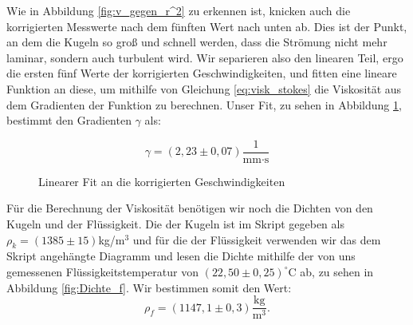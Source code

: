 \documentclass{article}
\begin{document}
\newpage
Wie in Abbildung \ref{fig:v_gegen_r^2} zu erkennen ist, knicken auch die korrigierten Messwerte nach dem fünften Wert nach unten ab. Dies ist der Punkt, an dem die Kugeln so groß und schnell werden, dass die Strömung nicht mehr laminar, sondern auch turbulent wird. Wir separieren also den linearen Teil, ergo die ersten fünf Werte der korrigierten Geschwindigkeiten, und fitten eine lineare Funktion an diese, um mithilfe von Gleichung \ref{eq:visk_stokes} die Viskosität aus dem Gradienten der Funktion zu berechnen. Unser Fit, zu sehen in Abbildung \ref{fig:FitStokes}, bestimmt den Gradienten $\gamma$ als:

\begin{equation}
    \gamma = (2,23 \pm 0,07) \frac{1}{\text{mm} \cdot \text{s}}
\end{equation}

\phantom{.}

\begin{figure}[!h]
    \centering
    \caption{Linearer Fit an die korrigierten Geschwindigkeiten}
    \label{fig:FitStokes}
\end{figure}

\phantom{.}

Für die Berechnung der Viskosität benötigen wir noch die Dichten von den Kugeln und der Flüssigkeit. Die der Kugeln ist im Skript gegeben als $\rho_k = (1385 \pm 15)$kg/m$^3$ und für die der Flüssigkeit verwenden wir das dem Skript angehängte Diagramm und lesen die Dichte mithilfe der von uns gemessenen Flüssigkeitstemperatur von $(22,50 \pm 0,25)^\circ$C ab, zu sehen in Abbildung \ref{fig:Dichte_f}. Wir bestimmen somit den Wert:
\begin{equation}
    \rho_f = (1147,1 \pm 0,3) \frac{\text{kg}}{\text{m}^3}.    
\end{equation}
\end{document}
